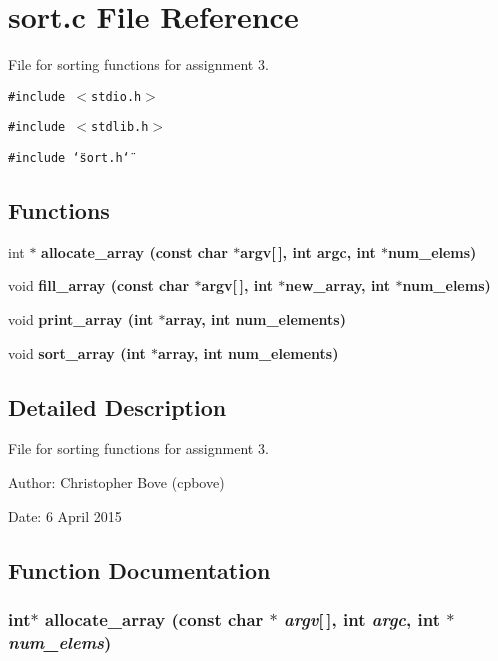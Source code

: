 \section{sort.c File Reference}
\label{sort_8c}
File for sorting functions for assignment 3. 

{\tt \#include $<$stdio.h$>$}\par
{\tt \#include $<$stdlib.h$>$}\par
{\tt \#include \char`\"{}sort.h\char`\"{}}\par
\subsection*{Functions}
\begin{CompactItemize}
\item 
int $\ast$ \bf{allocate\_\-array} (const char $\ast$argv[$\,$], int argc, int $\ast$num\_\-elems)
\item 
void \bf{fill\_\-array} (const char $\ast$argv[$\,$], int $\ast$new\_\-array, int $\ast$num\_\-elems)
\item 
void \bf{print\_\-array} (int $\ast$array, int num\_\-elements)
\item 
void \bf{sort\_\-array} (int $\ast$array, int num\_\-elements)
\end{CompactItemize}


\subsection{Detailed Description}
File for sorting functions for assignment 3. 

\begin{Desc}
\item[Author:]Christopher Bove (cpbove) \end{Desc}
\begin{Desc}
\item[Date:]6 April 2015 \end{Desc}


\subsection{Function Documentation}
\subsubsection{\setlength{\rightskip}{0pt plus 5cm}int$\ast$ allocate\_\-array (const char $\ast$ {\em argv}[$\,$], int {\em argc}, int $\ast$ {\em num\_\-elems})}\label{sort_8c_305a5d36cdfe1ffeff2da8f46d3d5454}


